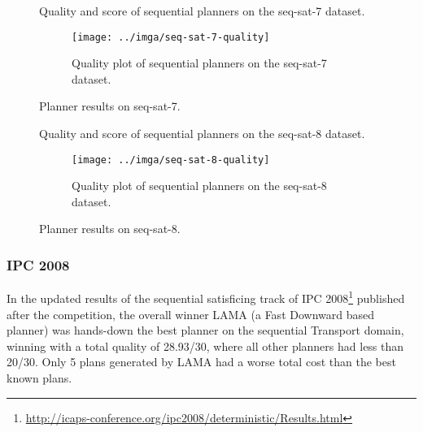 \begin{figure}[tbp]
\centering
\begin{subtable}{\textwidth}
\centering
\scriptsize
\renewcommand{\footnotesize}{\scriptsize}

\caption{Quality and score of sequential planners on the seq-sat-7 dataset.}
\label{tab:seq-sat-7-ipc-scores}
\end{subtable}

\vspace{0.5cm}
\begin{subfigure}{\textwidth}
\centering
\texttt{[image: ../imga/seq-sat-7-quality]}
\caption{Quality plot of sequential planners on the seq-sat-7 dataset.}
\label{fig:seq-sat-7-quality}
\end{subfigure}
\caption{Planner results on seq-sat-7.}
\label{fig:seq-sat-7-results}
\end{figure}

\begin{figure}[tbp]
\centering
\begin{subtable}{\textwidth}
\centering
\scriptsize
\renewcommand{\footnotesize}{\scriptsize}

\caption{Quality and score of sequential planners on the seq-sat-8 dataset.}
\label{tab:seq-sat-8-ipc-scores}
\end{subtable}

\vspace{0.5cm}
\begin{subfigure}{\textwidth}
\centering
\texttt{[image: ../imga/seq-sat-8-quality]}
\caption{Quality plot of sequential planners on the seq-sat-8 dataset.}
\label{fig:seq-sat-8-quality}
\end{subfigure}
\caption{Planner results on seq-sat-8.}
\label{fig:seq-sat-8-results}
\end{figure}



\subsubsection{IPC 2008}

In the updated results of the sequential satisficing track of IPC 2008\footnote{\url{http://icaps-conference.org/ipc2008/deterministic/Results.html}} published after the competition,
the overall winner LAMA (a Fast Downward based planner)
was hands-down the best planner on the sequential Transport domain, winning
with a total quality of 28.93/30, where all other planners had less than 20/30.
Only 5 plans generated by LAMA had a worse total cost than the best known plans.

